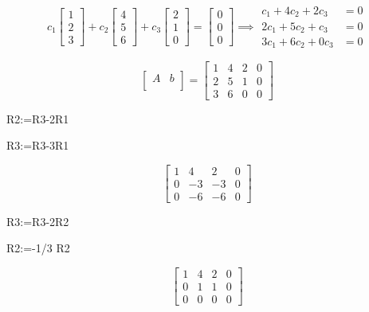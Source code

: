 \documentclass[12pt]{article}
\begin{document}
\begin{equation*}
  c_1 
  \begin{bmatrix}
    1 \\ 2 \\ 3
  \end{bmatrix}
  +
  c_2 
  \begin{bmatrix}
    4 \\ 5 \\ 6
  \end{bmatrix}
  +
  c_3 
  \begin{bmatrix}
    2 \\ 1 \\ 0
  \end{bmatrix}
  = 
  \begin{bmatrix}
    0 \\ 0 \\ 0
  \end{bmatrix}
  \implies
  \begin{aligned}
    c_1 + 4c_2 + 2c_3 &= 0 \\
    2c_1 + 5c_2 + c_3 &= 0 \\
    3c_1 + 6c_2 + 0c_3 &= 0
  \end{aligned}
\end{equation*}

\begin{equation*}
  \left[
  \begin{array}{c|c}
    A & b \\
  \end{array}
  \right]
  = \begin {bmatrix}
    1 & 4 & 2 & 0 \\
    2 & 5 & 1 & 0 \\
    3 & 6 & 0 & 0
  \end{bmatrix}
\end{equation*}

R2:=R3-2R1

R3:=R3-3R1

\begin{equation*}
  \begin{bmatrix}
    1 & 4 & 2 & 0 \\
    0 & -3 & -3 & 0 \\
    0 & -6 & -6 & 0
  \end{bmatrix}
\end{equation*}

R3:=R3-2R2

R2:=-1/3 R2

\begin{equation*}
  \begin{bmatrix}
    1 & 4 & 2 & 0 \\
    0 & 1 & 1 & 0 \\
    0 & 0 & 0 & 0
  \end{bmatrix}
\end{equation*}
\end{document}
